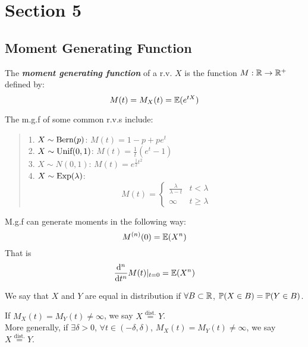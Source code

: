 \section{Section 5}
\subsection{Moment Generating Function}
\begin{definition}
    The \textbf{\textit{moment generating function}} of a r.v. $X$ is the function $M: \mathbb{R} \to \mathbb{R}^+$ defined by:
    $$M(t) = M_X(t) = \mathbb{E}(e^{tX})$$
\end{definition}
The m.g.f of some common r.v.s include:
\begin{quote}
    1. $X \sim \text{Bern}(p)$: $M(t) = 1 - p + pe^t$ \\
    2. $X \sim \text{Unif}(0, 1)$: $M(t) = \frac{1}{t}(e^t - 1)$ \\
    3. $X \sim N(0, 1)$: $M(t) = e^{\frac{1}{2}t^2}$ \\
    4. $X \sim \text{Exp}(\lambda)$:
    $$M(t) = \begin{cases}
        \frac{\lambda}{\lambda - t} & t < \lambda \\
        \infty & t \ge \lambda
    \end{cases}$$
\end{quote}
\begin{theorem}
    M.g.f can generate moments in the following way:
    $$M^{(n)}(0) = \mathbb{E}(X^n)$$
    That is
    $$\dv[n]{}{t}M(t)|_{t = 0} = \mathbb{E}(X^n)$$
\end{theorem}
We say that $X$ and $Y$ are equal in distribution if $\forall B \subset \mathbb{R}$, $\mathbb{P}(X \in B) = \mathbb{P}(Y \in B)$.
\begin{theorem}
    If $M_X(t) = M_Y(t) \ne \infty$, we say $X \stackrel{\text{dist.}}{=} Y$. \\
    More generally, if $\exists \delta > 0$, $\forall t \in (-\delta, \delta)$, $M_X(t) = M_Y(t) \ne \infty$, we say $X \stackrel{\text{dist.}}{=} Y$.
\end{theorem}


